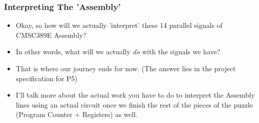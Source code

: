\documentclass{beamer}
\begin{document}
\begin{frame}
{

				}
				
			\end{frame}
			
			\begin{frame}
				\frametitle{Interpreting The 'Assembly'}
				\begin{itemize}
					\item Okay, so how will we actually 'interpret' these 14 parallel signals of CMSC389E Assembly?
					\item In other words, what will we actually \textit{do} with the signals we have?
					\item That is where our journey ends for now. (The answer lies in the project specification for P5)
					\item I'll talk more about the actual work you have to do to interpret the Assembly lines using an actual circuit once we finish the rest of the pieces of the puzzle (Program Counter + Registers) as well.
				\end{itemize}
			\end{frame}
       
             
            
        
   	
\end{document}

